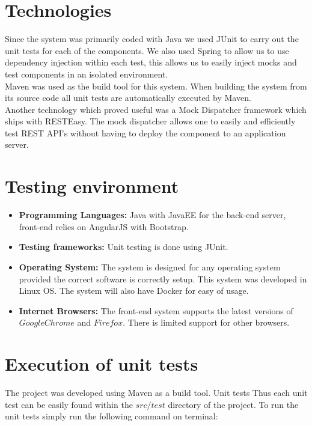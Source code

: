 \documentclass[11pt,a4paper]{article}
\begin{document}
\section{Technologies}

Since the system was primarily coded with Java we used JUnit to carry out the unit tests for each of the components. We also used Spring to allow us to use dependency injection within each test, this allows us to easily inject mocks and test components in an isolated environment. \\

Maven was used as the build tool for this system. When building the system from its source code all unit tests are automatically executed by Maven.  \\

Another technology which proved useful was a Mock Dispatcher framework which ships with RESTEasy. The mock dispatcher allows one to easily and efficiently test REST API's without having to deploy the component to an application server.

\section{Testing environment}
\begin{itemize}
	\item \textbf{Programming Languages:} Java with JavaEE for the back-end server, front-end relies on AngularJS with Bootstrap.
	\item \textbf{Testing frameworks: } Unit testing is done using JUnit.
	\item \textbf{Operating System: } The system is designed for any operating system provided the correct software is correctly setup. This system was developed in Linux OS. The system will also have Docker for easy of usage.
	\item \textbf{Internet Browsers: } The front-end system supports the latest versions of 
	$Google Chrome$ and $Firefox$. There is limited support for other browsers.
\end{itemize}

\section{Execution of unit tests}	
The project was developed using Maven as a build tool. Unit tests Thus each unit test can be easily found within the $src/test$ directory of the project. To run the unit tests simply run the following command on terminal: \\
\end{document}
